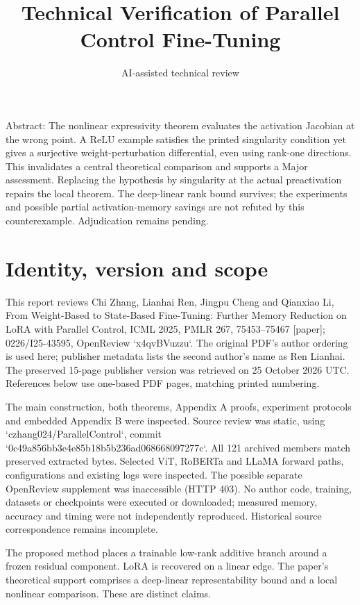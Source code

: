 \documentclass[10pt]{article}
\title{Technical Verification of Parallel Control Fine-Tuning}
\author{AI-assisted technical review}
\date{}
\begin{document}
\maketitle
Abstract: The nonlinear expressivity theorem evaluates the activation Jacobian at the wrong point. A ReLU example satisfies the printed singularity condition yet gives a surjective weight-perturbation differential, even using rank-one directions. This invalidates a central theoretical comparison and supports a Major assessment. Replacing the hypothesis by singularity at the actual preactivation repairs the local theorem. The deep-linear rank bound survives; the experiments and possible partial activation-memory savings are not refuted by this counterexample. Adjudication remains pending.\par
\section*{Identity, version and scope}
This report reviews Chi Zhang, Lianhai Ren, Jingpu Cheng and Qianxiao Li, From Weight-Based to State-Based Fine-Tuning: Further Memory Reduction on LoRA with Parallel Control, ICML 2025, PMLR 267, 75453–75467 [paper]; 0226/I25-43595, OpenReview `x4qvBVuzzu`. The original PDF’s author ordering is used here; publisher metadata lists the second author’s name as Ren Lianhai. The preserved 15-page publisher version was retrieved on 25 October 2026 UTC. References below use one-based PDF pages, matching printed numbering.\par
The main construction, both theorems, Appendix A proofs, experiment protocols and embedded Appendix B were inspected. Source review was static, using `czhang024/ParallelControl`, commit `0c49a856bb3e4e85b18b5b236ad068668097277c`. All 121 archived members match preserved extracted bytes. Selected ViT, RoBERTa and LLaMA forward paths, configurations and existing logs were inspected. The possible separate OpenReview supplement was inaccessible (HTTP 403). No author code, training, datasets or checkpoints were executed or downloaded; measured memory, accuracy and timing were not independently reproduced. Historical source correspondence remains incomplete.\par
The proposed method places a trainable low-rank additive branch around a frozen residual component. LoRA is recovered on a linear edge. The paper’s theoretical support comprises a deep-linear representability bound and a local nonlinear comparison. These are distinct claims.\par
\end{document}
